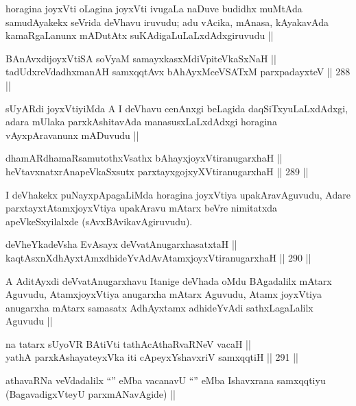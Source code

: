 \begin{artha}
horagina joyxVti oLagina joyxVti ivugaLa naDuve budidhx muMtAda samudAyakekx seVrida deVhavu iruvudu; adu vAcika, mAnasa, kAyakavAda kamaRgaLanunx mADutAtx suKAdigaLuLaLxdAdxgiruvudu ||
\end{artha}

\begin{shl}
BAnAvxdijoyxVtiSA soV\s yaM samayxkasxMdiVpiteVkaSxNaH || \\
tadUdxreVdadhxmanAH samxqqtAvx bAhAyxMceVSATxM parxpadayxteV ||  288 ||  
\end{shl}

\begin{artha}
sUyARdi joyxVtiyiMda A I deVhavu cenAnxgi beLagida daqSiTxyuLaLxdAdxgi, adara mUlaka parxkAshitavAda manasusxLaLxdAdxgi horagina vAyxpAravanunx mADuvudu ||
\end{artha}

\begin{shl}
dhamARdhamaRsamutothxV\s sathx bAhayxjoyxVtiranugarxhaH || \\
heVtavxnatxrAnapeVkaSxsutx parxtayxgojxyXVtiranugarxhaH ||   289 ||  
\end{shl}

\begin{artha}
I deVhakekx puNayxpApagaLiMda horagina joyxVtiya upakAravAguvudu, Adare parxtayxtAtamxjoyxVtiya upakAravu mAtarx beVre nimitatxda apeVkeSxyilalxde (sAvxBAvikavAgiruvudu).
\end{artha}

\begin{shl}
deVheYkadeVsha EvAsayx deVvatAnugarxhasatxtaH || \\
kaqtAsxnXdhAyxtAmxdhideYvAdAvAtamxjoyxVtiranugarxhaH ||  290 ||  
\end{shl}

\begin{artha}
A AditAyxdi deVvatAnugarxhavu Itanige deVhada oMdu BAgadalilx mAtarx Aguvudu, AtamxjoyxVtiya anugarxha mAtarx Aguvudu, Atamx joyxVtiya anugarxha mAtarx samasatx AdhAyxtamx adhideYvAdi sathxLagaLalilx Aguvudu || 
\end{artha}

\begin{shl}
na tatarx sUyoVR BAtiVti tathAcA\s \s thaRvaRNeV vacaH || \\
yathA parxkAshayateyxVka iti cApeyxYshavxriV samxqqtiH ||  291 ||  
\end{shl}

\begin{artha}
athavaRNa veVdadalilx ``\stext'' eMba vacanavU ``\stext'' eMba Ishavxrana samxqqtiyu (BagavadigxVteyU parxmANavAgide) ||
\end{artha}

